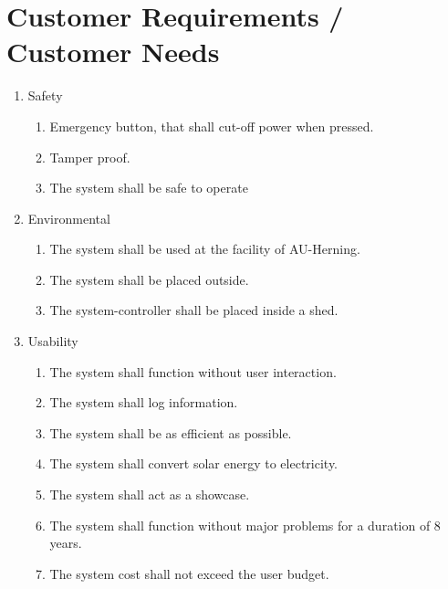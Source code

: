 \documentclass[12pt,a4paper]{report}
\begin{document}
\section{Customer Requirements / Customer Needs}
\begin{enumerate}
\item	Safety
\begin{enumerate}
	\item	Emergency button, that shall cut-off power when pressed.
	\item	Tamper proof.
	\item	The system shall be safe to operate
\end{enumerate}
\item	Environmental
\begin{enumerate}
	\item	The system shall be used at the facility of AU-Herning. 
	\item	The system shall be placed outside.
	\item	The system-controller shall be placed inside a shed.
\end{enumerate}
\item	Usability
\begin{enumerate}
	\item	The system shall function without user interaction.
	\item	The system shall log information.
	\item	The system shall be as efficient as possible.
	\item	The system shall convert solar energy to electricity.
	\item	The system shall act as a showcase.
	\item	The system shall function without major problems for a duration of 8 years.
	\item	The system cost shall not exceed the user budget.
\end{enumerate}
\end{enumerate}
\newpage
\end{document}
